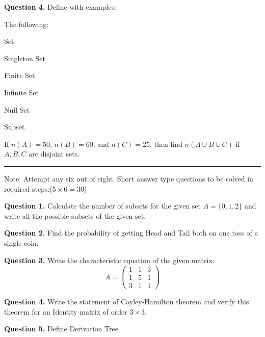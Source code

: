 \documentclass[11pt,a4paper]{article}
\begin{document}
\medskip


\noindent   \textbf{Question 4.} Define with examples:

\begin{parts}
  \item The following:
  
\begin{parts}
    \item Set
    \item Singleton Set
    \item Finite Set
    \item Infinite Set
    \item Null Set
    \item Subset
  \end{parts}
  \item If $n(A) = 50$, $n(B) = 60$, and $n(C) = 25$, then find $n(A \cup B \cup C)$ if $A, B, C$ are disjoint sets.
\end{parts}

\bigskip


\rule{\linewidth}{0.4pt}\smallskip

Note: Attempt any six out of eight. Short answer type questions to be solved in required steps:\hfill ($5  \times 6 = 30$)

\medskip


\noindent   \textbf{Question 1.} Calculate the number of subsets for the given set $A = \{0, 1, 2\}$ and write all the possible subsets of the given set.

\medskip


\noindent   \textbf{Question 2.} Find the probability of getting Head and Tail both on one toss of a single coin.

\medskip


\noindent   \textbf{Question 3.} Write the characteristic equation of the given matrix:
\[
A = 
\begin{pmatrix}
  1 & 1 & 3 \\
  1 & 5 & 1 \\
  3 & 1 & 1
\end{pmatrix}
\]

\medskip


\noindent   \textbf{Question 4.} Write the statement of Cayley-Hamilton theorem and verify this theorem for an Identity matrix of order $3  \times 3$.

\medskip


\noindent   \textbf{Question 5.} Define Derivation Tree.
\end{document}
